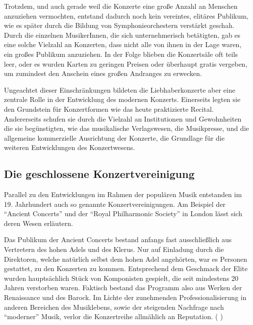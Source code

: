 \documentclass[a4paper, german, oneside]{scrbook}
\begin{document}
Trotzdem, und auch gerade weil die Konzerte eine große Anzahl an Menschen anzuziehen vermochten, entstand dadurch noch kein vereintes, elitäres Publikum, wie es später durch die Bildung von Symphonieorchestern verstärkt geschah. Durch die einzelnen MusikerInnen, die sich unternehmerisch betätigten, gab es eine solche Vielzahl an Konzerten, dass nicht alle von ihnen in der Lage waren, ein großes Publikum anzuziehen. In der Folge blieben die Konzertsäle oft teils leer, oder es wurden Karten zu geringen Preisen oder überhaupt gratis vergeben, um zumindest den Anschein eines großen Andranges zu erwecken. \parencite[vgl.][49ff.]{weber_music_2004}

Ungeachtet dieser Einschränkungen bildeten die Liebhaberkonzerte aber eine zentrale Rolle in der Entwicklung des modernen Konzerts. Einerseits legten sie den Grundstein für Konzertformen wie das heute praktizierte Recital. Andererseits schufen sie durch die Vielzahl an Institutionen und Gewohnheiten die sie begünstigten, wie das musikalische Verlagswesen, die Musikpresse, und die allgemeine kommerzielle Ausrichtung der Konzerte, die Grundlage für die weiteren Entwicklungen des Konzertwesens.

\subsection{Die geschlossene Konzertvereinigung}
\label{konzertvereinigung}

Parallel zu den Entwicklungen im Rahmen der populären Musik entstanden im 19. Jahrhundert auch so genannte Konzertvereinigungen. Am Beispiel der \enquote{Ancient Concerts} und der \enquote{Royal Philharmonic Society} in London lässt sich deren Wesen erläutern.

Das Publikum der Ancient Concerts bestand anfangs fast ausschließlich aus Vertretern des hohen Adels und des Klerus. Nur auf Einladung durch die Direktoren, welche natürlich selbst dem hohen Adel angehörten, war es Personen gestattet, zu den Konzerten zu kommen. Entsprechend dem Geschmack der Elite wurden hauptsächlich Stück von Komponisten gespielt, die seit mindestens 20 Jahren verstorben waren. Faktisch bestand das Programm also aus Werken der Renaissance und des Barock. Im Lichte der zunehmenden Professionalisierung in anderen Bereichen des Musiklebens, sowie der steigenden Nachfrage nach \enquote{moderner} Musik, verlor die Konzertreihe allmählich an Reputation. (\cite[92ff.;]{muller_publikum_2014} \cite[73]{weber_music_2004})
\end{document}
